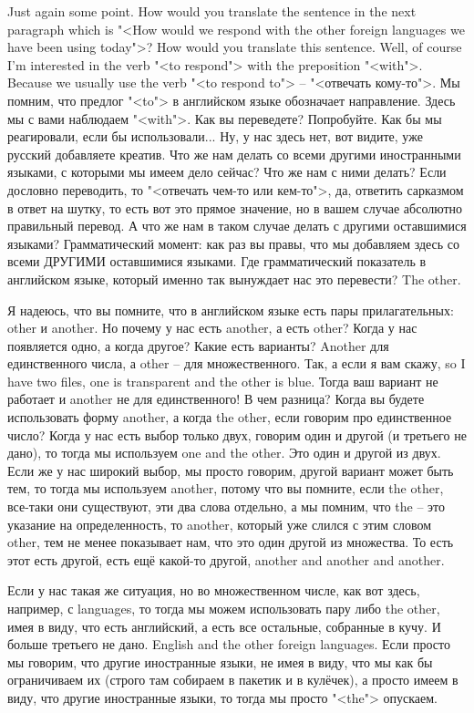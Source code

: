 \documentclass[main.tex]{subfiles}
\begin{document}
Just again some point.
How would you translate the sentence in the next paragraph which is "<How would we respond with the other foreign languages we have been using today">?
How would you translate this sentence.
Well, of course I'm interested in the verb "<to respond"> with the preposition "<with">.
Because we usually use the verb "<to respond to"> -- "<отвечать кому-то">.
Мы помним, что предлог "<to"> в английском языке обозначает направление.
Здесь мы с вами наблюдаем "<with">.
Как вы переведете?
Попробуйте.
Как бы мы реагировали, если бы использовали...
Ну, у нас здесь нет, вот видите, уже русский добавляете креатив.
Что же нам делать со всеми другими иностранными языками, с которыми мы имеем дело сейчас?
Что же нам с ними делать?
Если дословно переводить, то "<отвечать чем-то или кем-то">, да, ответить сарказмом в ответ на шутку, то есть вот это прямое значение, но в вашем случае абсолютно правильный перевод.
А что же нам в таком случае делать с другими оставшимися языками?
Грамматический момент: как раз вы правы, что мы добавляем здесь со всеми ДРУГИМИ оставшимися языками.
Где грамматический показатель в английском языке, который именно так вынуждает нас это перевести?
The other.

Я надеюсь, что вы помните, что в английском языке есть пары прилагательных: other и another.
Но почему у нас есть another, а есть other?
Когда у нас появляется одно, а когда другое?
Какие есть варианты?
Another для единственного числа, а other -- для множественного.
Так, а если я вам скажу, so I have two files, one is transparent and the other is blue.
Тогда ваш вариант не работает и another не для единственного!
В чем разница?
Когда вы будете использовать форму another, а когда the other, если говорим про единственное число?
Когда у нас есть выбор только двух, говорим один и другой (и третьего не дано), то тогда мы используем one and the other.
Это один и другой из двух.
Если же у нас широкий выбор, мы просто говорим, другой вариант может быть тем, то тогда мы используем another, потому что вы помните, если the other, все-таки они существуют, эти два слова отдельно, а мы помним, что the -- это указание на определенность, то another, который уже слился с этим словом other, тем не менее показывает нам, что это один другой из множества.
То есть этот есть другой, есть ещё какой-то другой, another and another and another.

Если у нас такая же ситуация, но во множественном числе, как вот здесь, например, с languages, то тогда мы можем использовать пару либо the other, имея в виду, что есть английский, а есть все остальные, собранные в кучу.
И больше третьего не дано.
English and the other foreign languages.
Если просто мы говорим, что другие иностранные языки, не имея в виду, что мы как бы ограничиваем их (строго там собираем в пакетик и в кулёчек), а просто имеем в виду, что другие иностранные языки, то тогда мы просто "<the"> опускаем.
\end{document}
